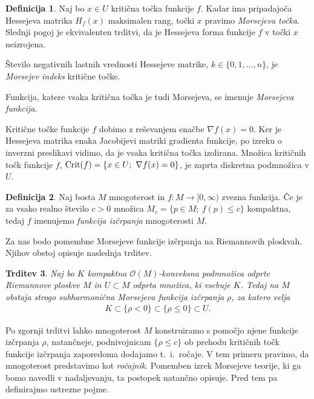 \documentclass[12pt,a4paper,twoside]{article}
\theoremstyle{definition} %
\newtheorem{definicija}{Definicija}[section]
\theoremstyle{plain} %
\newtheorem{trditev}[definicija]{Trditev}
\numberwithin{equation}{section}  %
\begin{document}
\begin{definicija}
Naj bo $x \in U$ kritična točka funkcije $f$. Kadar ima pripadajoča Hessejeva matrika $H_{f}(x)$ maksimalen rang, točki $x$ pravimo \emph{Morsejeva točka}. Slednji pogoj je ekvivalenten trditvi, da je Hessejeva forma funkcije $f$ v točki $x$ neizrojena.

Število negativnih lastnih vrednosti Hessejeve matrike, $k \in \{0,1, \dots , n\}$, je \emph{Morsejev indeks} kritične točke.

Funkcija, katere vsaka kritična točka je tudi Morsejeva, se imenuje \emph{Morsejeva funkcija}.
\end{definicija}

Kritične točke funkcije $f$ dobimo z reševanjem enačbe $\nabla f(x)=0$. Ker je Hessejeva matrika enaka Jacobijevi matriki gradienta funkcije, po izreku o inverzni preslikavi vidimo, da je vsaka kritična točka izolirana. Množica kritičnih točk funkcije $f$, $\textup{Crit}(f) = \{ x \in U; \ \nabla f(x)=0 \}$, je zaprta diskretna podmnožica v $U$.

\begin{definicija}
Naj bosta $M$ mnogoterost in $f \colon M \to [0, \infty)$ zvezna funkcija. Če je za vsako realno število $c>0$ množica $M_{c} = \{ p \in M; \ f(p) \leq c \}$ kompaktna, tedaj $f$ imenujemo \emph{funkcija izčrpanja} mnogoterosti $M$.
\end{definicija}

Za nas bodo pomembne Morsejeve funkcije izčrpanja na Riemannovih ploskvah. Njihov obstoj opisuje naslednja trditev.

\begin{trditev} \label{trd:Riem-ploskev-Morse-izcrpanje}
Naj bo $K$ kompaktna $\mathcal{O}(M)$-konveksna podmnožica odprte Riemannove ploskve $M$ in $U \subset M$ odprta množica, ki vsebuje $K$.
Tedaj na $M$ obstaja strogo subharmonična Morsejeva funkcija izčrpanja $\rho$, za katero velja 
\begin{gather*}
K \subset \{ \rho<0 \} \subset \{ \rho \leq 0 \} \subset U.
\end{gather*}
\end{trditev}

Po zgornji trditvi lahko mnogoterost $M$ konstruiramo s pomočjo njene funkcije izčrpanja $\rho$, natančneje, podnivojnicam $\{ \rho \leq c \}$ ob prehodu kritičnih točk funkcije izčrpanja zaporedoma dodajamo t.~i.~ročaje. V tem primeru pravimo, da mnogoterost predstavimo kot \emph{ročajnik}. Pomemben izrek Morsejeve teorije, ki ga bomo navedli v nadaljevanju, ta postopek natančno opisuje. Pred tem pa definirajmo ustrezne pojme.
\end{document}
